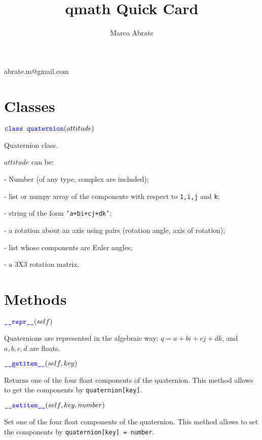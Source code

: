 \documentclass[11pt]{paper}
\begin{document}
\setcounter{page}{1}

\title{qmath Quick Card}
\author{Marco Abrate} 
\maketitle
\vskip-0.6cm
\noindent \small{abrate.m@gmail.com}




\tableofcontents

\section{Classes}

\noindent $\textcolor{blue}{\texttt{class quaternion}}(attitude)$

Quaternion class. 

$attitude$ can be:

- Number (of any type, complex are included);

- list or numpy array of the components with respect to \texttt{1,i,j} and \texttt{k}; 

- string of the form \texttt{'a+bi+cj+dk'};

- a rotation about an axis using pairs (rotation angle, axis of rotation);

- list whose components are Euler angles;

- a 3X3 rotation matrix.

\bigskip

\section{Methods}
\noindent $\textcolor{blue}{\texttt{\_\_repr\_\_}}(self)$ 

Quaternions are represented in the algebraic way: $q = a+bi+cj+dk$, and $a,b,c,d$ are floats.

\medskip
 
\noindent $\textcolor{blue}{\texttt{\_\_\mbox{getitem}\_\_}}(self,key)$

Returns one of the four float components of the quaternion. This method allows to get the components by \texttt{quaternion[key]}.

\medskip

\noindent $\textcolor{blue}{\texttt{\_\_\mbox{setitem}\_\_}}(self,key, number)$

Set one of the four float components of the quaternion. This method allows to set the components by \texttt{quaternion[key] = number}.
\end{document}
